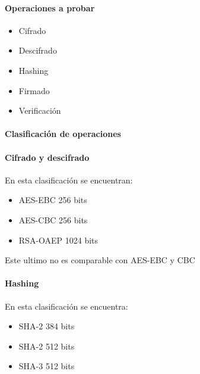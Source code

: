\documentclass[../main.tex]{subfiles}
\begin{document}
\hypertarget{operaciones-a-probar}{%
  \paragraph{Operaciones a probar}\label{operaciones-a-probar}}

\begin{itemize}
        \tightlist{}
  \item
        Cifrado
  \item
        Descifrado
  \item
        Hashing
  \item
        Firmado
  \item
        Verificación
\end{itemize}

\hypertarget{clasificaciuxf2n-de-operaciones}{%
  \paragraph{Clasificación de
    operaciones}\label{clasificaciuxf2n-de-operaciones}}

\hypertarget{cifrado-y-decifrado}{%
  \paragraph{Cifrado y descifrado}\label{cifrado-y-decifrado}}

En esta clasificación se encuentran:

\begin{itemize}
        \tightlist{}
  \item
        AES-EBC 256 bits
  \item
        AES-CBC 256 bits
  \item
        RSA-OAEP 1024 bits
\end{itemize}

Este ultimo no es comparable con AES-EBC y CBC

\hypertarget{hashing}{%
  \paragraph{Hashing}\label{hashing}}

En esta clasificación se encuentra:

\begin{itemize}
        \tightlist{}
  \item
        SHA-2 384 bits
  \item
        SHA-2 512 bits
  \item
        SHA-3 512 bits
\end{itemize}
\end{document}
